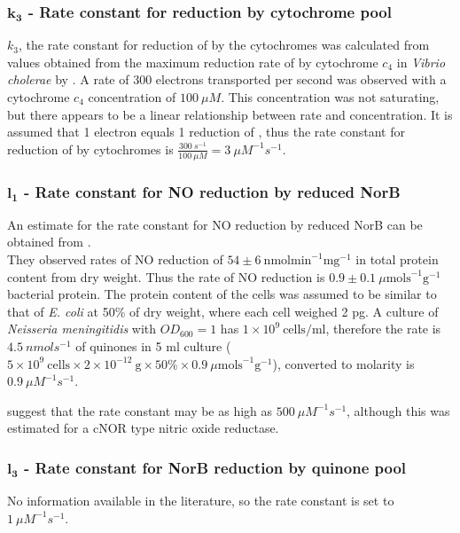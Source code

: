 \subsubsection*{$\mathbf{k_3}$ {\bf- Rate constant for \cbbthree{} reduction by cytochrome pool}}
$k_3$, the rate constant for reduction of \cbbthree{} by the cytochromes was calculated from values obtained from the maximum reduction rate of \cbbthree{} by cytochrome $c_4$ in \textit{Vibrio cholerae} by \citet{Chang2010}. A rate of 300 electrons transported per second was observed with a cytochrome $c_4$ concentration of $100~\mu M$. This concentration was not saturating, but there appears to be a linear relationship between rate and concentration. It is assumed that 1 electron equals 1 reduction of \cbbthree{}, thus the rate constant for reduction of \cbbthree{} by cytochromes is $\frac{300~s^{-1}}{100~\mu M} = 3~\mu M^{-1}s^{-1}$.

\subsubsection*{$\mathbf{l_1}$ {\bf- Rate constant for NO reduction by reduced NorB}}

An estimate for the rate constant for NO reduction by reduced NorB can be obtained from \citet{Rock2007}.\\
\noindent They observed rates of NO reduction of $54 \pm 6~\mathrm{nmolmin}^{-1} \mathrm{mg}^{-1}$  in total protein content from dry weight. Thus the rate of NO reduction is $0.9 \pm 0.1~\mu\mathrm{mol s}^{-1}\mathrm{g}^{-1}$ bacterial protein. The protein content of the cells was assumed to be similar to that of \textit{E. coli} at 50\% of dry weight, where each cell weighed 2 pg. A culture of \textit{Neisseria meningitidis} with $OD_{600} = 1$ has $1 \times 10^9~\textrm{cells/ml}$, therefore the rate is $4.5~nmols^{-1}$ of quinones in 5 ml culture ($5\times 10^9~\textrm{cells} \times 2\times 10^{-12}~\textrm{g} \times 50\% \times 0.9~\mu\mathrm{mol s}^{-1}\mathrm{g}^{-1}$), converted to molarity is $0.9~\mu M^{-1} s^{-1}$.

\citet{Wasser2002} suggest that the rate constant may be as high as $500~\mu M^{-1} s^{-1}$, although this was estimated for a cNOR type nitric oxide reductase.

\subsubsection*{$\mathbf{l_3}$ {\bf- Rate constant for NorB reduction by quinone pool}}
No information available in the literature, so the rate constant is set to $1~\mu M^{-1}s^{-1}$.

